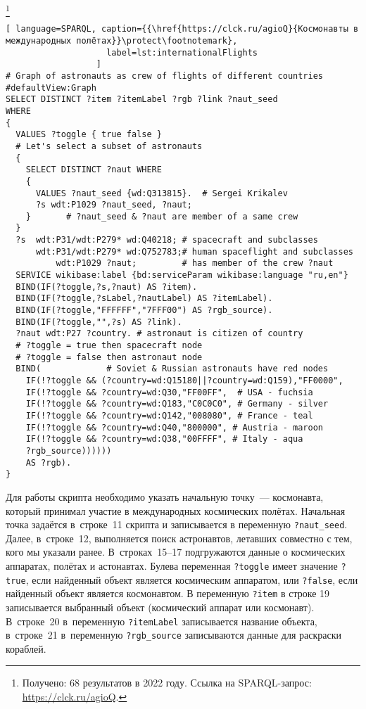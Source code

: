 \footnote[17][2\baselineskip]{Получено: 68 результатов в 2022 году. Ссылка на SPARQL-запрос: \href{https://clck.ru/agioQ}{https://clck.ru/agioQ}.}
\begin{lstlisting}[ language=SPARQL, caption={{\href{https://clck.ru/agioQ}{Космонавты в международных полётах}}\protect\footnotemark}, 
                    label=lst:internationalFlights
                  ]
# Graph of astronauts as crew of flights of different countries
#defaultView:Graph
SELECT DISTINCT ?item ?itemLabel ?rgb ?link ?naut_seed
WHERE
{ 
  VALUES ?toggle { true false }
  # Let's select a subset of astronauts
  {
    SELECT DISTINCT ?naut WHERE
    { 
      VALUES ?naut_seed {wd:Q313815}.  # Sergei Krikalev
      ?s wdt:P1029 ?naut_seed, ?naut;  
    }       # ?naut_seed & ?naut are member of a same crew
  }
  ?s  wdt:P31/wdt:P279* wd:Q40218; # spacecraft and subclasses
      wdt:P31/wdt:P279* wd:Q752783;# human spaceflight and subclasses
          wdt:P1029 ?naut;         # has member of the crew ?naut    
  SERVICE wikibase:label {bd:serviceParam wikibase:language "ru,en"}
  BIND(IF(?toggle,?s,?naut) AS ?item).
  BIND(IF(?toggle,?sLabel,?nautLabel) AS ?itemLabel).
  BIND(IF(?toggle,"FFFFFF","7FFF00") AS ?rgb_source).
  BIND(IF(?toggle,"",?s) AS ?link).
  ?naut wdt:P27 ?country. # astronaut is citizen of country 
  # ?toggle = true then spacecraft node
  # ?toggle = false then astronaut node
  BIND(             # Soviet & Russian astronauts have red nodes
    IF(!?toggle && (?country=wd:Q15180||?country=wd:Q159),"FF0000",
    IF(!?toggle && ?country=wd:Q30,"FF00FF",  # USA - fuchsia
    IF(!?toggle && ?country=wd:Q183,"C0C0C0", # Germany - silver
    IF(!?toggle && ?country=wd:Q142,"008080", # France - teal
    IF(!?toggle && ?country=wd:Q40,"800000", # Austria - maroon
    IF(!?toggle && ?country=wd:Q38,"00FFFF", # Italy - aqua
    ?rgb_source))))))
    AS ?rgb).
}
\end{lstlisting}

Для работы скрипта необходимо указать начальную точку~--- космонавта, 
который принимал участие в международных космических полётах. 
Начальная точка задаётся в~строке~11 скрипта и записывается в переменную \lstinline|?naut_seed|. 
Далее, в~строке~12, выполняется поиск астронавтов, 
летавших совместно с тем, кого мы указали ранее. 
В~строках~15--17 подгружаются данные о космических аппаратах, полётах и астонавтах. 
Булева переменная \lstinline|?toggle| имеет значение \lstinline|?true|, 
если найденный объект является космическим аппаратом, 
или \lstinline|?false|, 
если найденный объект является космонавтом. 
В переменную \lstinline|?item| в строке 19 записывается выбранный объект (космический аппарат или космонавт). 
В~строке~20 в~переменную \lstinline|?itemLabel| записывается название объекта, 
в~строке~21 в~переменную \lstinline|?rgb_source| записываются данные для раскраски кораблей. 

